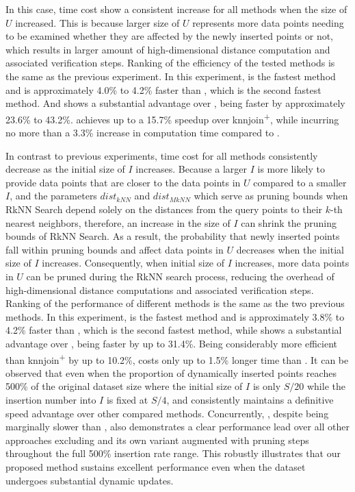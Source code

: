 
In this case, time cost show a consistent increase for all methods when the size of $U$ increased. This is because larger size of $U$ represents more data points needing to be examined whether they are affected by the newly inserted points or not, which results in larger amount of high-dimensional distance computation and associated verification steps. Ranking of the efficiency of the tested methods is the same as the previous experiment. In this experiment, \cpdualtree is the fastest method and is approximately 4.0\% to 4.2\% faster than \spdualtree, which is the second fastest method. And \spdualtree shows a substantial advantage over \hdrtree, being faster by approximately 23.6\% to 43.2\%. \dualtree achieves up to a 15.7\% speedup over knnjoin\textsuperscript{+}, while incurring no more than a 3.3\% increase in computation time compared to \hdrtree. 

 In contrast to previous experiments, time cost for all methods consistently decrease as the initial size of $I$ increases. Because a larger $I$ is more likely to provide data points that are closer to the data points in $U$ compared to a smaller $I$, and the parameters $dist_{kNN}$ and $dist_{MkNN}$ which serve as pruning bounds when RkNN Search depend solely on the distances from the query points to their $k$-th nearest neighbors, therefore, an increase in the size of $I$ can shrink the pruning bounds of RkNN Search. As a result, the probability that newly inserted points fall within pruning bounds and affect data points in $U$ decreases when the initial size of $I$ increases. Consequently, when initial size of $I$ increases, more data points in $U$ can be pruned during the RkNN search process, reducing the overhead of high-dimensional distance computations and associated verification steps. Ranking of the performance of different methods is the same as the two previous methods. In this experiment, \cpdualtree is the fastest method and  is approximately 3.8\% to 4.2\% faster than \spdualtree, which is the second fastest method, while \spdualtree shows a substantial advantage over \hdrtree, being faster by up to 31.4\%. Being considerably more efficient than knnjoin\textsuperscript{+} by up to 10.2\%, \dualtree costs only up to 1.5\% longer time than \hdrtree. It can be observed that even when the proportion of dynamically inserted points reaches 500\% of the original dataset size where the initial size of $I$ is only $S/20$ while the insertion number into $I$ is fixed at $S/4$, \cpdualtree and \spdualtree consistently maintains a definitive speed advantage over other compared methods. Concurrently, \dualtree, despite being marginally slower than \hdrtree, also demonstrates a clear performance lead over all other approaches excluding \hdrtree and its own variant augmented with pruning steps throughout the full 500\% insertion rate range. This robustly illustrates that our proposed method sustains excellent performance even when the dataset undergoes substantial dynamic updates.

